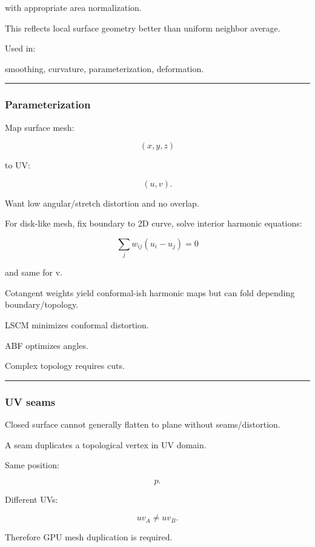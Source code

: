 with appropriate area normalization.

This reflects local surface geometry better than uniform neighbor average.

Used in:

smoothing, curvature, parameterization, deformation.

\begin{center}\rule{0.5\linewidth}{0.5pt}\end{center}

\subsubsection{Parameterization}\label{parameterization}

Map surface mesh:

\[
(x,y,z)
\]

to UV:

\[
(u,v).
\]

Want low angular/stretch distortion and no overlap.

For disk-like mesh, fix boundary to 2D curve, solve interior harmonic equations:

\[
\boxed{
\sum_j
w_{ij}
(u_i-u_j)=0
}
\]

and same for v.

Cotangent weights yield conformal-ish harmonic maps but can fold depending boundary/topology.

LSCM minimizes conformal distortion.

ABF optimizes angles.

Complex topology requires cuts.

\begin{center}\rule{0.5\linewidth}{0.5pt}\end{center}

\subsubsection{UV seams}\label{uv-seams}

Closed surface cannot generally flatten to plane without seams/distortion.

A seam duplicates a topological vertex in UV domain.

Same position:

\[
p.
\]

Different UVs:

\[
uv_A\ne uv_B.
\]

Therefore GPU mesh duplication is required.

